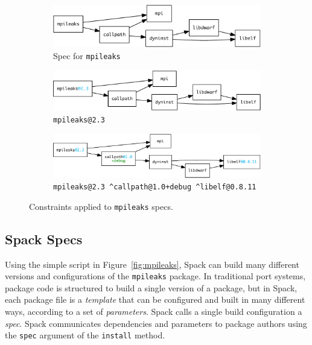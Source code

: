 
\begin{figure}
	\begin{subfigure}{\linewidth}
		\centering
		\includegraphics[width=.9\columnwidth]{specs/mpileaks.pdf}
		\caption{
			Spec for {\tt mpileaks}
			\label{fig:specs-mpileaks}
		}
	\end{subfigure}
%
	\begin{subfigure}{\linewidth}
		\centering
		\includegraphics[width=.9\columnwidth]{specs/mpileaks-version}
		\caption{
			{\tt mpileaks@2.3}
			\label{fig:specs-mpileaks-version}
		}
	\end{subfigure}
%
	\begin{subfigure}{\linewidth}
		\centering
		\includegraphics[width=.9\columnwidth]{specs/mpileaks-abstract.pdf}
		\caption{
			{\tt mpileaks@2.3 \^{}callpath@1.0+debug \^{}libelf@0.8.11}
			\label{fig:specs-mpileaks-abstract}
		}
	\end{subfigure}
%
	\caption{
		Constraints applied to {\tt mpileaks} specs.
	}
	\label{fig:specs}
\end{figure}



\subsection{Spack Specs}\label{sec:specs}

Using the simple script in Figure~\ref{fig:mpileaks}, Spack can build many different
versions and configurations of the {\tt mpileaks} package.  In traditional port systems,
package code is structured to build a single version of a package, but in Spack, each
package file is a {\it template} that can be configured and built in many
different ways, according to a set of {\it parameters}.
Spack calls a single build configuration a {\it spec}. 
Spack communicates dependencies and parameters to package authors using
the {\tt spec} argument of the {\tt install} method.

